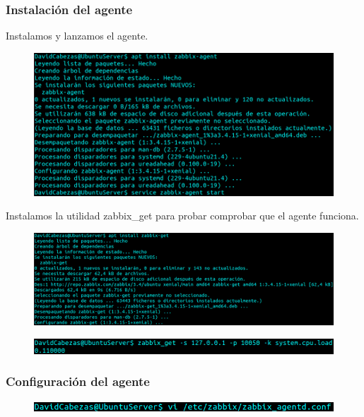 \documentclass{article}
\begin{document}
\subsubsection*{Instalación del agente}

Instalamos y lanzamos el agente.

\begin{figure}[H]
  \centering
  \includegraphics[width=140mm]{screenshots/agent_installation}
\end{figure}

Instalamos la utilidad zabbix\_get para probar comprobar que el agente
funciona.

\begin{figure}[H]
  \centering
  \includegraphics[width=160mm]{screenshots/zabbix-get}
\end{figure}

\begin{figure}[H]
  \centering
  \includegraphics[width=140mm]{screenshots/zabbix_get}
\end{figure}

\subsubsection*{Configuración del agente}

\begin{figure}[H]
  \centering
  \includegraphics[width=140mm]{screenshots/us_vi_agent-conf}
\end{figure}
\end{document}
